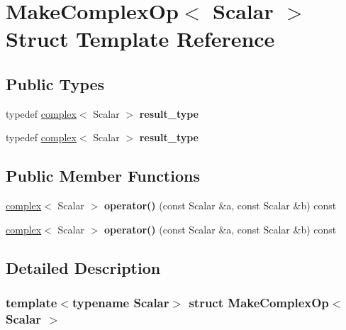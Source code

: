 \hypertarget{struct_make_complex_op}{}\section{Make\+Complex\+Op$<$ Scalar $>$ Struct Template Reference}
\label{struct_make_complex_op}
\subsection*{Public Types}
\begin{DoxyCompactItemize}
\item 
\mbox{\label{struct_make_complex_op_ac88e887371140abb02376a809ddda7ae}} 
typedef \hyperlink{structcomplex}{complex}$<$ Scalar $>$ {\bfseries result\+\_\+type}
\item 
\mbox{\label{struct_make_complex_op_ac88e887371140abb02376a809ddda7ae}} 
typedef \hyperlink{structcomplex}{complex}$<$ Scalar $>$ {\bfseries result\+\_\+type}
\end{DoxyCompactItemize}
\subsection*{Public Member Functions}
\begin{DoxyCompactItemize}
\item 
\mbox{\label{struct_make_complex_op_a5a67b7743c3d4fb71b70bb289b979b70}} 
\hyperlink{structcomplex}{complex}$<$ Scalar $>$ {\bfseries operator()} (const Scalar \&a, const Scalar \&b) const
\item 
\mbox{\label{struct_make_complex_op_a5a67b7743c3d4fb71b70bb289b979b70}} 
\hyperlink{structcomplex}{complex}$<$ Scalar $>$ {\bfseries operator()} (const Scalar \&a, const Scalar \&b) const
\end{DoxyCompactItemize}


\subsection{Detailed Description}
\subsubsection*{template$<$typename Scalar$>$\newline
struct Make\+Complex\+Op$<$ Scalar $>$}



